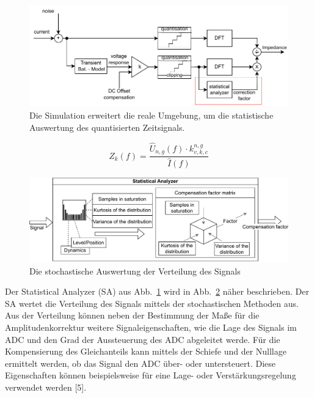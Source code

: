 \begin{figure}[!htb] 
	\centering 
	\includegraphics[width=1.1\columnwidth]{../img/histo_sim.pdf}
	\caption{Die Simulation erweitert die reale Umgebung, um die statistische Auswertung des quantisierten Zeitsignals.}
	\label{fig:Simulation}
\end{figure}
\begin{equation}
	\label{eq:corr_mat}
	Z_k(f) = \frac{\hat{U}_{n,g}(f) \cdot k_{v,k,c}^{n,g}}{\hat{I}(f)}
\end{equation}
\begin{figure}[!htb] 
	\centering 
	\includegraphics[width=1\textwidth]{../img/stat_analyser.pdf}
	\caption{Die stochastische Auswertung der Verteilung des Signals }
	\label{fig:sa}
\end{figure}




Der Statistical Analyzer (SA) aus Abb.~\ref{fig:Simulation} wird in Abb.~\ref{fig:sa} näher beschrieben. Der SA wertet die Verteilung des Signals mittels der stochastischen Methoden aus. Aus der Verteilung können neben der Bestimmung der Maße für die Amplitudenkorrektur weitere Signaleigenschaften, wie die Lage des Signals im ADC und den Grad der Aussteuerung des ADC abgeleitet werde. Für die Kompensierung des Gleichanteils kann mittels der Schiefe und der Nulllage ermittelt werden, ob das Signal den ADC über- oder  untersteuert. Diese Eigenschaften können beispielsweise für eine Lage- oder Verstärkungsregelung verwendet werden [5].


